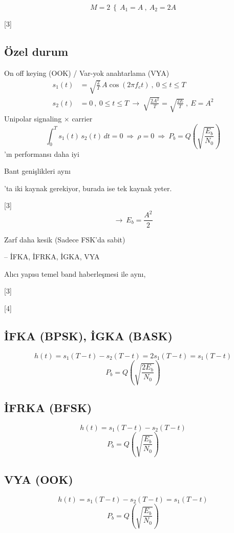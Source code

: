 \documentclass[11pt,a4paper]{article}
\begin{document}
\[ M=2\ \left\{\ A_1=A\ ,\ A_2=2A\right. \]

[3]

\subsection{Özel durum}
On off keying (OOK) / Var-yok anahtarlama (VYA)
\begin{align*}
s_1(t)&=\sqrt{\tfrac{2}{T}}\,A\cos(2\pi f_ct)\ ,\ 0\le t\le T\\
s_2(t)&=0\ ,\ 0\le t\le T\ \longrightarrow\ \sqrt{\tfrac{2A^2}{T}}=\sqrt{\tfrac{2E}{T}}\ ,\ E=A^2
\end{align*}
Unipolar signaling $\times$ carrier
\[ \int_0^T s_1(t)\,s_2(t)\,dt=0\ \Rightarrow\ \rho=0\ \Rightarrow\ P_b=Q\!\left(\sqrt{\frac{E_b}{N_0}}\right) \]
'ın performansı daha iyi

Bant genişlikleri aynı

'ta iki kaynak gerekiyor, burada ise tek kaynak yeter.

[3]
\[ \rightarrow\ E_b=\frac{A^2}{2} \]

Zarf daha kesik (Sadece FSK'da sabit)

-- İFKA, İFRKA, İGKA, VYA

Alıcı yapısı temel band haberleşmesi ile aynı,

[3]

[4]

\subsection{İFKA (BPSK), İGKA (BASK)}
\[ h(t)=s_1(T-t)-s_2(T-t)=2s_1(T-t)=s_1(T-t) \]
\[ P_b=Q\!\left(\sqrt{\frac{2E_b}{N_0}}\right) \]

\subsection{İFRKA (BFSK)}
\[ h(t)=s_1(T-t)-s_2(T-t) \]
\[ P_b=Q\!\left(\sqrt{\frac{E_b}{N_0}}\right) \]

\subsection{VYA (OOK)}
\[ h(t)=s_1(T-t)-s_2(T-t)=s_1(T-t) \]
\[ P_b=Q\!\left(\sqrt{\frac{E_b}{N_0}}\right) \]
\end{document}

